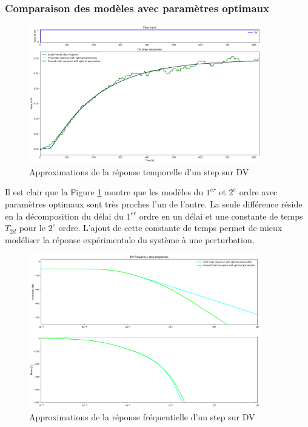 \documentclass{article}
\begin{document}
\subsubsection{Comparaison des modèles avec paramètres optimaux}

\begin{figure}[H]
    \centering
    \includegraphics[width=0.9\textwidth]{../Plots/DV_Approximations_comparison_time.png}
    \caption{Approximations de la réponse temporelle d'un step sur DV}
    \label{fig:DV_approximation_comparison_time}
\end{figure}
Il est clair que la Figure \ref{fig:DV_approximation_comparison_time} montre que les modèles du $1^{er}$ et $2^{e}$ ordre avec paramètres optimaux sont très proches l'un de l'autre.
La seule différence réside en la décomposition du délai du $1^{er}$ ordre en un délai et une constante de temps $T_{2d}$ pour le $2^{e}$ ordre.
L'ajout de cette constante de temps permet de mieux modéliser la réponse expérimentale du système à une perturbation.
\begin{figure}[H]
    \centering
    \includegraphics[width=0.9\textwidth]{../Plots/DV_Approximations_comparison_frequency.png}
    \caption{Approximations de la réponse fréquentielle d'un step sur DV}
    \label{fig:DV_approximation_comparison_frequency}
\end{figure}
\end{document}
